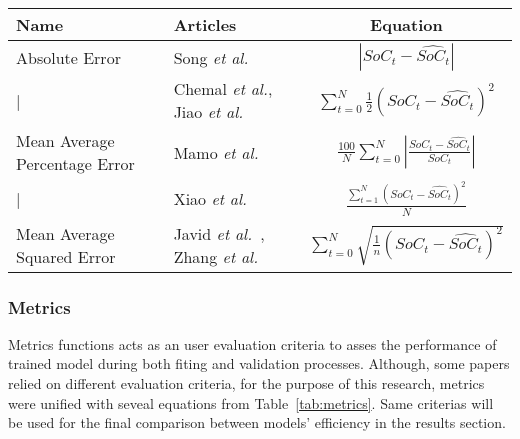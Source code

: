     \begin{tabular}{ l l c }
        \hline
        Name & Articles & Equation \\ 
        \hline
        Absolute Error & Song \textit{et al.}~\cite{song_lithium-ion_2018} & $|SoC_t-\hat{SoC_t}|$ \\
        \hline
        | & Chemal \textit{et al.}\cite{Chemali2017}, Jiao \textit{et al.}~\cite{jiao_gru-rnn_2020} & $\sum\limits^N_{t=0} \frac{1}{2} (SoC_t-\hat{SoC_t})^2$ \\
        \hline
        Mean Average Percentage Error & Mamo \textit{et al.}~\cite{mamo_long_2020} & $\frac{100}{N}\sum\limits^N_{t=0}|\frac{SoC_t-\hat{SoC_t}}{SoC_t}|$ \\
        \hline
        | & Xiao \textit{et al.}~\cite{xiao_accurate_2019} & $\frac{\sum\limits^N_{t=1}(SoC_t-\hat{SoC_t})^2}{N}$ \\
        \hline
        Mean Average Squared Error & Javid \textit{et al.}~\cite{javid_adaptive_2020}, Zhang \textit{et al.}~\cite{zhang_deep_2020} & $\sum\limits^N_{t=0} \sqrt{\frac{1}{n} (SoC_t-\hat{SoC_t})^2}$ \\
        \hline
    \end{tabular}
\subsubsection{Metrics}
Metrics functions acts as an user evaluation criteria to asses the performance of trained model during both fiting and validation processes.
Although, some papers relied on different evaluation criteria, for the purpose of this research, metrics were unified with seveal equations from Table~\ref{tab:metrics}.
Same criterias will be used for the final comparison between models' efficiency in the results section.

